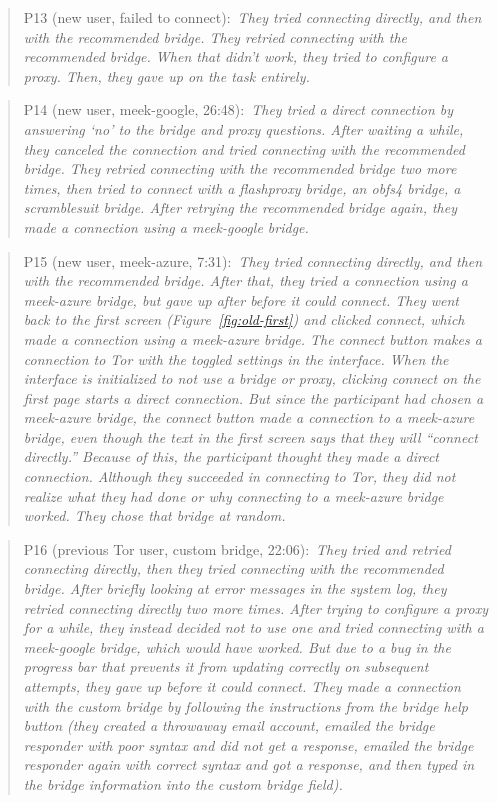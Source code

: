 \documentclass[USenglish,oneside,twocolumn]{article}
\newcommand{\pquote}[2]{
\begin{quotation}
\noindent #1:~\textit{#2}
\end{quotation}
}
\begin{document}
\pquote{P13 (new user, failed to connect)}{They tried connecting directly, and then with the recommended bridge. They retried connecting with the recommended bridge. When that didn't work, they tried to configure a proxy. Then, they gave up on the task entirely.}

\pquote{P14 (new user, meek-google, 26:48)}{They tried a direct connection by answering `no' to the bridge and proxy questions. After waiting a while, they canceled the connection and tried connecting with the recommended bridge. They retried connecting with the recommended bridge two more times, then tried to connect with a flashproxy bridge, an obfs4 bridge, a scramblesuit bridge. After retrying the recommended bridge again, they made a connection using a meek-google bridge.}

\pquote{P15 (new user, meek-azure, 7:31)}{They tried connecting directly, and then with the recommended bridge. After that, they tried a connection using a meek-azure bridge, but gave up after before it could connect. They went back to the first screen (Figure~\ref{fig:old-first}) and clicked connect, which made a connection using a meek-azure bridge. The connect button makes a connection to Tor with the toggled settings in the interface. When the interface is initialized to not use a bridge or proxy, clicking connect on the first page starts a direct connection. But since the participant had chosen a meek-azure bridge, the connect button made a connection to a meek-azure bridge, even though the text in the first screen says that they will ``connect directly.'' Because of this, the participant thought they made a direct connection. Although they succeeded in connecting to Tor, they did not realize what they had done or why connecting to a meek-azure bridge worked. They chose that bridge at random.}

\pquote{P16 (previous Tor user, custom bridge, 22:06)}{They tried and retried connecting directly, then they tried connecting with the recommended bridge. After briefly looking at error messages in the system log, they retried connecting directly two more times. After trying to configure a proxy for a while, they instead decided not to use one and tried connecting with a meek-google bridge, which would have worked. But  due to a bug in the progress bar that prevents it from updating correctly on subsequent attempts, they gave up before it could connect. They made a connection with the custom bridge by following the instructions from the bridge help button (they created a throwaway email account, emailed the bridge responder with poor syntax and did not get a response, emailed the bridge responder again with correct syntax and got a response, and then typed in the bridge information into the custom bridge field).}
\end{document}
